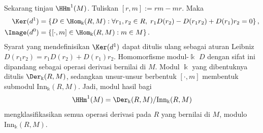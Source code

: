 \begin{contoh}\label{eg:HH1}
	Sekarang tinjau $\HHm^1(M)$. Tuliskan $[r,m]:=rm-mr$. Maka
	\begin{align*}
		\Ker(d^1)
		&=\left\{D\in\Hom_{\Bbbk}(R,M):
		\forall r_1,r_2\in R,\;
		r_1D(r_2)-D(r_1r_2)+D(r_1)r_2=0\right\},\\
		\Image(d^0)
		&=\left\{[\mathord{\cdot},m]\in\Hom_{\Bbbk}(R,M):m\in M\right\}.
	\end{align*}
	Syarat yang mendefinisikan $\Ker(d^1)$ dapat ditulis ulang sebagai
	aturan Leibniz
	$D(r_1r_2)=r_1D(r_2)+D(r_1)r_2$. Homomorfisme modul-$\Bbbk$ $D$ dengan
	sifat ini dipandang sebagai operasi derivasi bernilai di $M$. Modul
	$\Bbbk$ yang dibentuknya ditulis $\Der_{\Bbbk}(R,M)$, sedangkan
	unsur-unsur berbentuk $[\mathord{\cdot},m]$ membentuk submodul
	$\mathrm{Inn}_{\Bbbk}(R,M)$. Jadi, modul hasil bagi
	\[ \HHm^1(M)=\Der_{\Bbbk}(R,M)/\mathrm{Inn}_{\Bbbk}(R,M) \]
	mengklasifikasikan semua operasi derivasi pada $R$ yang bernilai di $M$,
	modulo $\mathrm{Inn}_{\Bbbk}(R,M)$.


\end{contoh}
